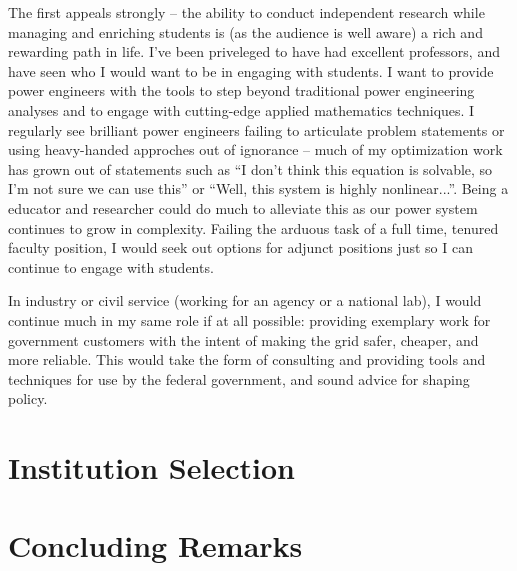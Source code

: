 \documentclass[letterpaper]{article}
\begin{document}
The first appeals strongly -- the ability to conduct independent research while managing
and enriching students is (as the audience is well aware) a rich and rewarding path in life.
I've been priveleged to have had excellent professors, and have seen who I would want to be
in engaging with students. I want to provide power engineers with the tools
to step beyond traditional power engineering analyses and to engage with cutting-edge
applied mathematics techniques. I regularly see brilliant power engineers
failing to articulate problem statements or using heavy-handed approches out of ignorance
-- much of my optimization work has grown out of statements such as ``I don't think this equation
is solvable, so I'm not sure we can use this''  or ``Well, this system is highly
nonlinear...''. Being a educator and researcher could do much to alleviate this as
our power system continues to grow in complexity. Failing the arduous task of
a full time, tenured faculty position, I would seek out options for adjunct positions
just so I can continue to engage with students.

In industry or civil service (working for an agency or a national lab), I would continue
much in my same role if at all possible: providing exemplary work for government customers
with the intent of making the grid safer, cheaper, and more reliable. This would take the
form of consulting and providing tools and techniques for use by the federal government,
and sound advice for shaping policy.


\section*{Institution Selection}

\section*{Concluding Remarks}
\end{document}
